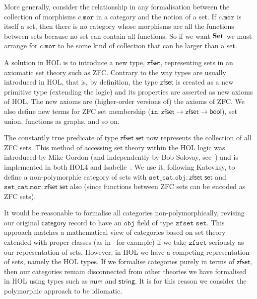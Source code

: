 \documentclass[twoside,titlepage,11pt]{article}
\begin{document}
More generally, consider the relationship in any formalisation between the collection of morphisms $c.\mathtt{mor}$ in a category and the notion of a set.
If $c.\mathtt{mor}$ is itself a set, then there is no category whose morphisms are all the functions between sets because no set can contain all functions.
So if we want $\mathbf{Set}$ we must arrange for $c.\mathtt{mor}$ to be some kind of collection that can be larger than a set.

A solution in HOL is to introduce a new type, $\mathsf{zfset}$, representing sets in an axiomatic set theory such as ZFC.
Contrary to the way types are usually introduced in HOL, that is, by definition, the type $\mathsf{zfset}$ is created as a new primitive type (extending the logic) and its properties are asserted as new axioms of HOL.
The new axioms are (higher-order versions of) the axioms of ZFC.
We also define new terms for ZFC set membership ($\mathtt{in}:\mathsf{zfset}\to\mathsf{zfset}\to\mathsf{bool}$), set union, functions as graphs, and so on.

The constantly true predicate of type $\mathsf{zfset}\;\mathsf{set}$ now represents the collection of all ZFC sets.
This method of accessing set theory within the HOL logic was introduced by Mike Gordon \cite{DBLP:conf/tphol/Gordon96} (and independently by Bob Solovay, see~\cite{DBLP:conf/ictac/Obua06}) and is implemented in both HOL4 and Isabelle~\cite{DBLP:conf/ictac/Obua06}.
We use it, following Katovksy, to define a non-polymorphic category of sets with $\mathtt{set\_cat}.\mathtt{obj}:\mathsf{zfset}\;\mathsf{set}$ and $\mathtt{set\_cat}.\mathtt{mor}:\mathsf{zfset}\;\mathsf{set}$ also (since functions between ZFC sets can be encoded as ZFC sets).

It would be reasonable to formalise all categories non-polymorphically, revising our original $\mathsf{category}$ record to have an $\mathtt{obj}$ field of type $\mathtt{zfset}\;\mathtt{set}$.
This approach matches a mathematical view of categories based on set theory extended with proper classes (as in~\cite{MacLaneCFTWM} for example) if we take $\mathtt{zfset}$ seriously as our representation of sets.
However, in HOL we have a competing representation of sets, namely the HOL types.
If we formalise categories purely in terms of $\mathsf{zfset}$, then our categories remain disconnected from other theories we have formalised in HOL using types such as $\mathsf{num}$ and $\mathsf{string}$.
It is for this reason we consider the polymorphic approach to be idiomatic.
\end{document}
